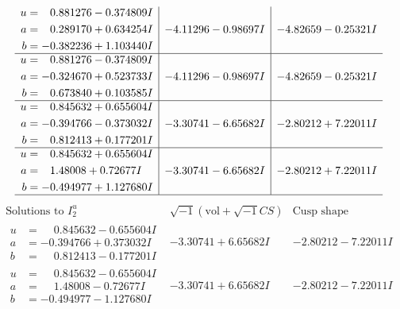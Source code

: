 \documentclass[1p]{elsarticle_modified}
\theoremstyle{definition}
\newcommand{\I}{\sqrt{-1}}
\begin{document}
$$\begin{array}{c|c|c}
\begin{aligned}
u &= \phantom{-}0.881276 - 0.374809 I \\
a &= \phantom{-}0.289170 + 0.634254 I \\
b &= -0.382236 + 1.103440 I\end{aligned}
 & -4.11296 - 0.98697 I & -4.82659 - 0.25321 I \\ \hline\begin{aligned}
u &= \phantom{-}0.881276 - 0.374809 I \\
a &= -0.324670 + 0.523733 I \\
b &= \phantom{-}0.673840 + 0.103585 I\end{aligned}
 & -4.11296 - 0.98697 I & -4.82659 - 0.25321 I \\ \hline\begin{aligned}
u &= \phantom{-}0.845632 + 0.655604 I \\
a &= -0.394766 - 0.373032 I \\
b &= \phantom{-}0.812413 + 0.177201 I\end{aligned}
 & -3.30741 - 6.65682 I & -2.80212 + 7.22011 I \\ \hline\begin{aligned}
u &= \phantom{-}0.845632 + 0.655604 I \\
a &= \phantom{-}1.48008 + 0.72677 I \\
b &= -0.494977 + 1.127680 I\end{aligned}
 & -3.30741 - 6.65682 I & -2.80212 + 7.22011 I\\
 \hline 
 \end{array}$$\newpage$$\begin{array}{c|c|c}  
\text{Solutions to }I^u_{2}& \I (\text{vol} + \sqrt{-1}CS) & \text{Cusp shape}\\
 \hline 
\begin{aligned}
u &= \phantom{-}0.845632 - 0.655604 I \\
a &= -0.394766 + 0.373032 I \\
b &= \phantom{-}0.812413 - 0.177201 I\end{aligned}
 & -3.30741 + 6.65682 I & -2.80212 - 7.22011 I \\ \hline\begin{aligned}
u &= \phantom{-}0.845632 - 0.655604 I \\
a &= \phantom{-}1.48008 - 0.72677 I \\
b &= -0.494977 - 1.127680 I\end{aligned}
 & -3.30741 + 6.65682 I & -2.80212 - 7.22011 I \\ \hline\begin{aligned}

\end{aligned}
\end{array}$$
\end{document}
